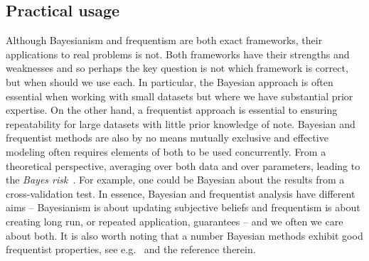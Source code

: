 \subsection{Practical usage}
\label{sec:bayes:religion:correct}

Although Bayesianism and frequentism are both exact frameworks, their applications to real problems is not.
Both frameworks have their strengths and weaknesses and so perhaps the key question is not which framework
is correct, but when should we use each.  In
particular, the Bayesian approach is often essential when working with small datasets but where we have substantial
prior expertise.  On the other hand, a frequentist approach is essential to ensuring repeatability for large
datasets with little prior knowledge of note.  Bayesian and frequentist methods are also by no means mutually 
exclusive and effective modeling often requires elements of both
to be used concurrently.  From a theoretical perspective,
 averaging over both data and over parameters, leading to the \emph{Bayes risk}~\citep{robert2007bayesian}.   
For example, one could be Bayesian about the results from a cross-validation test.
In essence, Bayesian and frequentist analysis have different aims -- Bayesianism is about updating
subjective beliefs and frequentism is about creating long run, or repeated application, guarantees -- 
and we often we care about both.  It is also worth noting that a number Bayesian methods exhibit
good frequentist properties, see e.g.~\cite{mcallester2013pac} and the reference therein.

